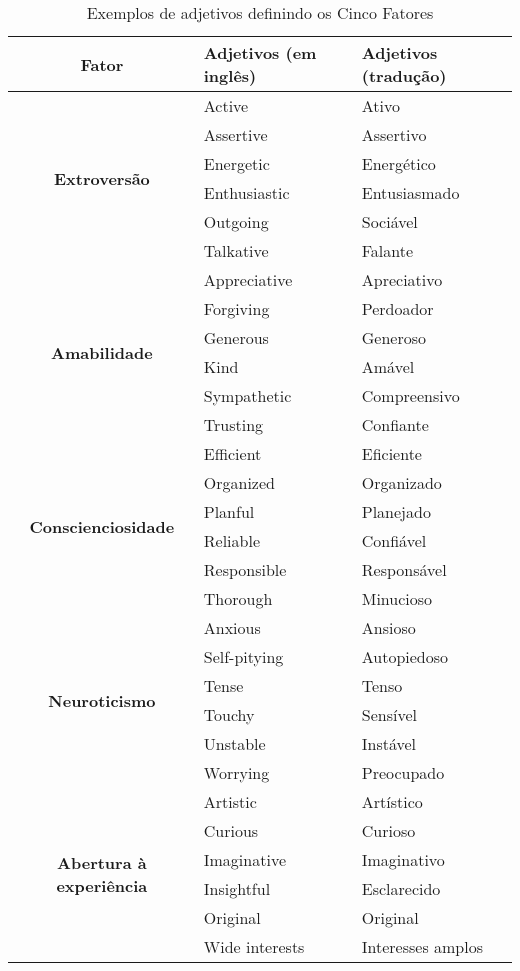 \begin{table*}[ht]
\footnotesize
\caption{\small Exemplos de adjetivos definindo os Cinco Fatores} 
\addtolength{\tabcolsep}{-3.5pt}
\renewcommand{\arraystretch}{1.4} 
\centering
	
		    \begin{tabular}{|c|l|l|}
    \hline %
    \textbf{Fator} & \textbf{Adjetivos (em inglês)} & \textbf{Adjetivos (tradução)} \\
    \hline %
    \multirow{6}[2]{*}{\textbf{Extroversão}} & Active & Ativo \\
          & Assertive & Assertivo \\
          & Energetic & Energético \\
          & Enthusiastic & Entusiasmado \\
          & Outgoing & Sociável \\
          & Talkative & Falante \\ \hline
    \multirow{6}[2]{*}{\textbf{Amabilidade}} & Appreciative & Apreciativo \\
          & Forgiving & Perdoador \\
          & Generous & Generoso \\
          & Kind  & Amável \\
          & Sympathetic & Compreensivo \\
          & Trusting & Confiante \\ \hline
		\multirow{6}[1]{*}{\textbf{Conscienciosidade}} & Efficient & Eficiente \\
          & Organized & Organizado \\
          & Planful & Planejado \\
          & Reliable & Confiável \\
          & Responsible & Responsável \\
          & Thorough & Minucioso \\ \hline
    \multirow{6}[0]{*}{\textbf{Neuroticismo}} & Anxious & Ansioso \\
          & Self-pitying & Autopiedoso \\
          & Tense & Tenso \\
          & Touchy & Sensível \\
          & Unstable & Instável \\
          & Worrying & Preocupado \\ \hline
    \multirow{6}[0]{*}{\textbf{Abertura à experiência}} & Artistic & Artístico \\
          & Curious & Curioso \\
          & Imaginative & Imaginativo \\
          & Insightful & Esclarecido \\
          & Original & Original \\
          & Wide interests & Interesses amplos \\
    \hline %
    \end{tabular}%
		\label{tab:adjetivos}
\end{table*}

